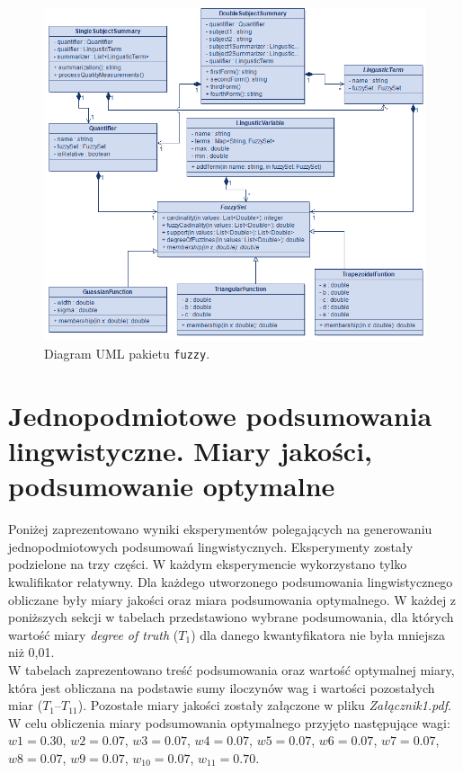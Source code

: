 \documentclass{article}
\begin{document}
\begin{figure}[H]
\centering
\includegraphics[width=\textwidth]{img/lingustic.png}
\caption{Diagram UML pakietu \texttt{fuzzy}.}
\end{figure}


\section{ Jednopodmiotowe podsumowania lingwistyczne. Miary jakości, podsumowanie optymalne}
Poniżej zaprezentowano wyniki eksperymentów polegających na generowaniu jednopodmiotowych podsumowań lingwistycznych. Eksperymenty zostały podzielone na trzy części. W każdym eksperymencie wykorzystano tylko kwalifikator relatywny. Dla każdego utworzonego podsumowania lingwistycznego obliczane były miary jakości oraz miara podsumowania optymalnego. W każdej z poniższych sekcji w tabelach przedstawiono wybrane podsumowania, dla których wartość miary \textit{degree of truth} (\(T_1\)) dla danego kwantyfikatora nie była mniejsza niż 0{,}01. \\
W tabelach zaprezentowano treść podsumowania oraz wartość optymalnej miary, która jest obliczana na podstawie sumy iloczynów wag i wartości pozostałych miar (\(T_1\)–\(T_{11}\)). Pozostałe miary jakości zostały załączone w pliku \textit{Załącznik1.pdf}. W celu obliczenia miary podsumowania optymalnego przyjęto następujące wagi: \(w1 = 0.30\), \(w2 = 0.07\), \(w3 = 0.07\), \(w4 = 0.07\), \(w5 = 0.07\), \(w6 = 0.07\), \(w7 = 0.07\), \(w8 = 0.07\), \(w9 = 0.07\), \(w_{10} = 0.07\), \(w_{11} = 0.70\).
\end{document}
